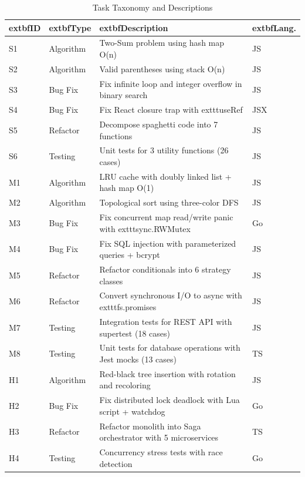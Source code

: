 \documentclass[conference]{IEEEtran}
\begin{document}
\begin{table}[h]
\centering
\caption{Task Taxonomy and Descriptions}
\label{tab:task_definitions}
\small
\begin{tabular}{@{}p{0.8cm}p{2cm}p{5.5cm}p{1.8cm}@{}}
\toprule
			extbf{ID} & 			extbf{Type} & 			extbf{Description} & 			extbf{Lang.} \\
\midrule
S1 & Algorithm & Two-Sum problem using hash map O(n) & JS \\
S2 & Algorithm & Valid parentheses using stack O(n) & JS \\
S3 & Bug Fix & Fix infinite loop and integer overflow in binary search & JS \\
S4 & Bug Fix & Fix React closure trap with 			exttt{useRef} & JSX \\
S5 & Refactor & Decompose spaghetti code into 7 functions & JS \\
S6 & Testing & Unit tests for 3 utility functions (26 cases) & JS \\
\midrule
M1 & Algorithm & LRU cache with doubly linked list + hash map O(1) & JS \\
M2 & Algorithm & Topological sort using three-color DFS & JS \\
M3 & Bug Fix & Fix concurrent map read/write panic with 			exttt{sync.RWMutex} & Go \\
M4 & Bug Fix & Fix SQL injection with parameterized queries + bcrypt & JS \\
M5 & Refactor & Refactor conditionals into 6 strategy classes & JS \\
M6 & Refactor & Convert synchronous I/O to async with 			exttt{fs.promises} & JS \\
M7 & Testing & Integration tests for REST API with supertest (18 cases) & JS \\
M8 & Testing & Unit tests for database operations with Jest mocks (13 cases) & TS \\
\midrule
H1 & Algorithm & Red-black tree insertion with rotation and recoloring & JS \\
H2 & Bug Fix & Fix distributed lock deadlock with Lua script + watchdog & Go \\
H3 & Refactor & Refactor monolith into Saga orchestrator with 5 microservices & TS \\
H4 & Testing & Concurrency stress tests with race detection & Go \\
\bottomrule
\end{tabular}
\end{table}
\end{document}
